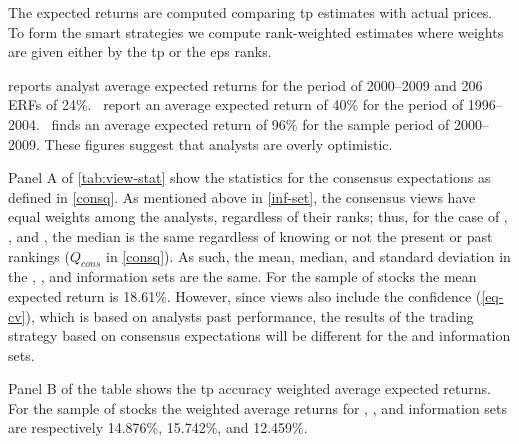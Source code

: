 \documentclass[a4paper,twoside,12pt,openright,notitlepage]{report}\usepackage[]{graphicx}\usepackage[]{color}
\begin{document}
The expected returns  are computed comparing \gls{tp} estimates with actual prices. To form the smart strategies we compute rank-weighted estimates where weights are given either by the \gls{tp} or the \gls{eps} ranks.

\cite{bradshaw2002} reports analyst average expected returns for the period of 2000--2009 and 206 ERFs of 24\%.~\cite{da2011} report an average expected return of 40\% for the period of 1996--2004.~\cite{zhou2013} finds an average expected return of 96\% for the sample period of 2000--2009. These figures suggest that analysts are overly optimistic.

Panel A of \ref{tab:view-stat} show the statistics for the consensus expectations as defined in \ref{consq}. As mentioned above in \ref{inf-set}, the consensus views have equal weights among the analysts, regardless of their ranks; thus, for the case of \tr{}, \naive{}, and , the median is the same regardless of knowing or not the present or past rankings ($Q_{cons}$ in  \ref{consq}). As such, the mean, median, and standard deviation in the \tr{}, \naive{}, and  information sets are the same. For the sample of \all{} stocks the mean expected return is 18.61\%. However, since views also include the confidence (\ref{eq-cv}), which is based on analysts past performance, the results of the trading strategy based on consensus expectations will be different for the \naive{} and  information sets.


Panel B of the table shows the \gls{tp} accuracy weighted average expected returns. For the sample of \all{} stocks the weighted average returns for \tr{}, \naive{}, and  information sets are respectively 14.876\%, 15.742\%, and 12.459\%.

\end{document}
